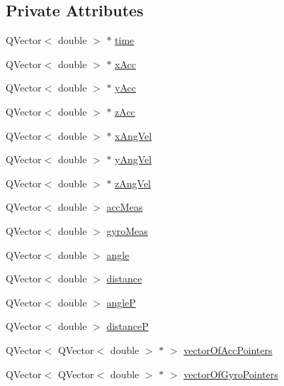 \subsection*{Private Attributes}
\begin{DoxyCompactItemize}
\item 
Q\+Vector$<$ double $>$ $\ast$ \mbox{\hyperlink{class_measurement_handler_a7a996cf87f9f6672d20ed131c233b46d}{time}}
\item 
Q\+Vector$<$ double $>$ $\ast$ \mbox{\hyperlink{class_measurement_handler_ad4ea68ff7e50ebf22877bdcb4b59014c}{x\+Acc}}
\item 
Q\+Vector$<$ double $>$ $\ast$ \mbox{\hyperlink{class_measurement_handler_ad47e97b391be68ded5c9b0aaa6d8eb0e}{y\+Acc}}
\item 
Q\+Vector$<$ double $>$ $\ast$ \mbox{\hyperlink{class_measurement_handler_a733eb0086b7fcdb942a770a178fd3862}{z\+Acc}}
\item 
Q\+Vector$<$ double $>$ $\ast$ \mbox{\hyperlink{class_measurement_handler_a7204dfd635bc3ea6f90278c6794bd4b6}{x\+Ang\+Vel}}
\item 
Q\+Vector$<$ double $>$ $\ast$ \mbox{\hyperlink{class_measurement_handler_a070b01770bd61164f1b4672bea4f14dd}{y\+Ang\+Vel}}
\item 
Q\+Vector$<$ double $>$ $\ast$ \mbox{\hyperlink{class_measurement_handler_ac1b7d9eed922dccadd0381ce51b488a5}{z\+Ang\+Vel}}
\item 
Q\+Vector$<$ double $>$ \mbox{\hyperlink{class_measurement_handler_abc15cc3967c7aad564b8b6b5101b9123}{acc\+Meas}}
\item 
Q\+Vector$<$ double $>$ \mbox{\hyperlink{class_measurement_handler_a3e543a5cb746a2bed6edac66303d733b}{gyro\+Meas}}
\item 
Q\+Vector$<$ double $>$ \mbox{\hyperlink{class_measurement_handler_a5107fd78f0e0b98517fb75d1fc5af906}{angle}}
\item 
Q\+Vector$<$ double $>$ \mbox{\hyperlink{class_measurement_handler_a198dfa7b2a559fe07fc3a56aeab40f20}{distance}}
\item 
Q\+Vector$<$ double $>$ \mbox{\hyperlink{class_measurement_handler_a4e1ab2116fcc94b5c6f03ede6c814176}{angleP}}
\item 
Q\+Vector$<$ double $>$ \mbox{\hyperlink{class_measurement_handler_a28b1160039b46fd8cc55f1141bfd11b9}{distanceP}}
\item 
Q\+Vector$<$ Q\+Vector$<$ double $>$ $\ast$ $>$ \mbox{\hyperlink{class_measurement_handler_abd8f5d782e7f5196d3cc45801a938a03}{vector\+Of\+Acc\+Pointers}}
\item 
Q\+Vector$<$ Q\+Vector$<$ double $>$ $\ast$ $>$ \mbox{\hyperlink{class_measurement_handler_a07c61fa9e798a9ea0b94fa247f486d7b}{vector\+Of\+Gyro\+Pointers}}
\end{DoxyCompactItemize}


